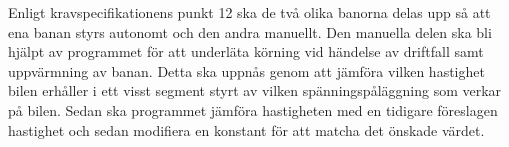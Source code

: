 Enligt kravspecifikationens punkt 12 ska de två olika banorna delas upp så att
ena banan styrs autonomt och den andra manuellt.  Den manuella delen ska bli
hjälpt av programmet för att underläta körning vid händelse av driftfall samt
uppvärmning av banan.  Detta ska uppnås genom att jämföra vilken hastighet bilen
erhåller i ett visst segment styrt av vilken spänningspåläggning som verkar på
bilen.  Sedan ska programmet jämföra hastigheten med en tidigare föreslagen
hastighet och sedan modifiera en konstant för att matcha det önskade värdet.

